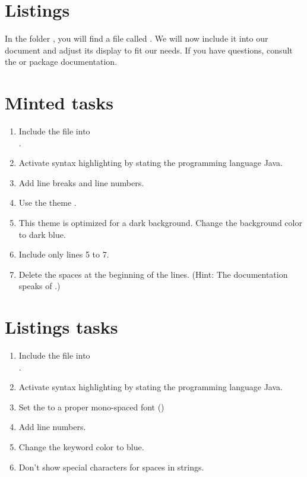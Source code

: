 \section{Listings}

In the folder , you will find a file called .
We will now include it into our document and adjust its display to fit our needs.
If you have questions, consult the  or  package documentation.

\section*{Minted tasks}

\begin{enumerate}
  \item Include the file into \\
  .
  \item Activate syntax highlighting by stating the programming language Java.
  \item Add line breaks and line numbers.
  \item Use the theme .
  \item This theme is optimized for a dark background. Change the background color to dark blue.
  \item Include only lines 5 to 7.
  \item Delete the spaces at the beginning of the lines. (Hint: The documentation speaks of .)
\end{enumerate}

\section*{Listings tasks}

\begin{enumerate}
  \item Include the file into \\
  .
  \item Activate syntax highlighting by stating the programming language Java.
  \item Set the  to a proper mono-spaced font ()
  \item Add line numbers.
  \item Change the keyword color to blue.
  \item Don't show special characters for spaces in strings.
\end{enumerate}


